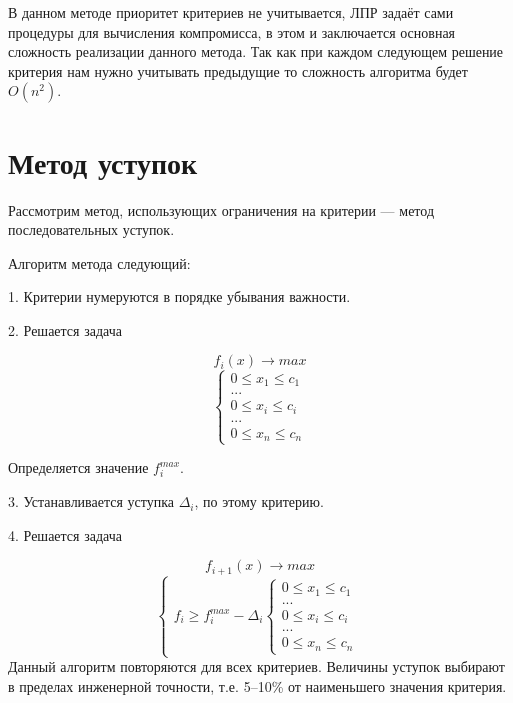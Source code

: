 \documentclass[a4paper,14pt]{report}
\begin{document}
В данном методе приоритет критериев не учитывается, ЛПР задаёт сами процедуры для вычисления компромисса, в этом и заключается основная сложность реализации данного метода. Так как при каждом следующем решение критерия нам нужно учитывать предыдущие то сложность алгоритма будет $O(n^2)$. 

\section{Метод уступок}
Рассмотрим метод, использующих ограничения на критерии --- метод последовательных уступок. 

Алгоритм метода следующий:

1. Критерии нумеруются в порядке убывания важности.

2. Решается задача

\begin{equation}
f_i(x) \rightarrow max
\label{ref:lim}
\end{equation}
\begin{equation}
\begin{cases}
0 \leq x_1 \leq c_1 \\
... \\
0 \leq x_i \leq c_i \\
... \\
0 \leq x_n \leq c_n 
\end{cases}
\label{ref:lim}
\end{equation}

Определяется значение $f^{max}_i$.

3. Устанавливается уступка $\Delta_i$, по этому критерию.

4. Решается задача

\begin{equation}
f_{i+1}(x) \rightarrow max
\label{ref:lim}
\end{equation}
\begin{equation}
\begin{cases}
f_i \geq f^{max}_i - \Delta_i
\begin{cases}
0 \leq x_1 \leq c_1 \\
... \\
0 \leq x_i \leq c_i \\
... \\
0 \leq x_n \leq c_n 
\end{cases}
\end{cases}
\label{ref:lim}
\end{equation}
Данный алгоритм повторяются для всех критериев.
Величины уступок выбирают в пределах инженерной точности, т.е. 5--10\% от наименьшего значения критерия.
\end{document}
